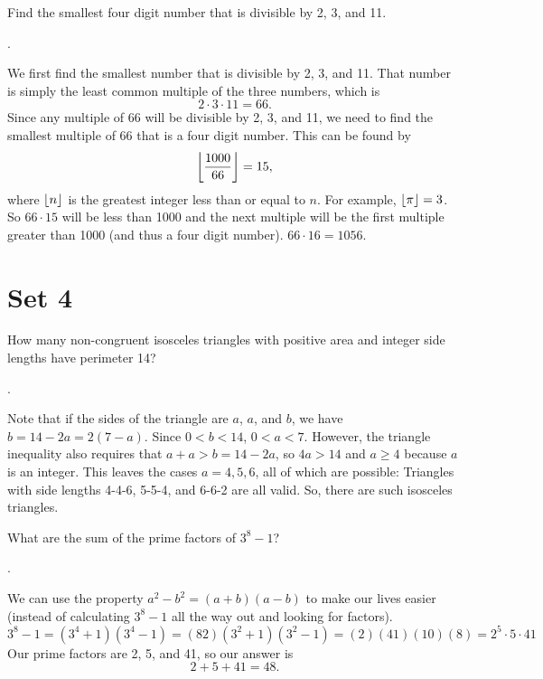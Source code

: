 \documentclass[11pt]{article}
\DeclareRobustCommand{\frac}[3][0pt]{%
  {\begingroup\hspace{#1}#2\hspace{#1}\endgroup\over\hspace{#1}#3\hspace{#1}}}
\begin{document}
\begin{problem}Find the smallest four digit number that is divisible by 2, 3, and 11.
\end{problem}
\begin{answer}
.
\end{answer}
\begin{solution}
We first find the smallest number that is divisible by 2, 3, and 11. That number is simply the least common multiple of the three numbers, which is
$$2\cdot 3\cdot 11=66.$$
Since any multiple of 66 will be divisible by 2, 3, and 11, we need to find the smallest multiple of 66 that is a four digit number. This can be found by
$$\floor{\frac{1000}{66}}=15,$$
where $\left\lfloor n \right\rfloor$ is the greatest integer less than or equal to $n$. For example, $\left\lfloor \pi \right\rfloor=3$. \\
So $66 \cdot 15$ will be less than 1000 and the next multiple will be the first multiple greater than 1000 (and thus a four digit number). $66 \cdot 16 = \boxed{1056}.$
\end{solution}

\eject

\section*{Set 4}

\begin{problem}
How many non-congruent isosceles triangles with positive area and integer side lengths have perimeter 14?
\end{problem}
\begin{answer}
.
\end{answer}
\begin{solution}
Note that if the sides of the triangle are $a$, $a$, and $b$, we have $b = 14 - 2a = 2(7 - a)$. Since $0 < b < 14$, $0 < a < 7$. However, the triangle inequality also requires that $a + a > b = 14 - 2a$, so $4a > 14$ and $a \geq 4$ because $a$ is an integer. This leaves the cases $a = 4, 5, 6$, all of which are possible: Triangles with side lengths 4-4-6, 5-5-4, and 6-6-2 are all valid. So, there are  such isosceles triangles.
\end{solution}

\begin{problem}
What are the sum of the prime factors of $3^{8}-1$?
\end{problem}
\begin{answer}
.
\end{answer}
\begin{solution}
We can use the property $a^2-b^2 = (a+b)(a-b)$ to make our lives easier (instead of calculating $3^8-1$ all the way out and looking for factors).
$$3^8-1 = (3^4+1)(3^4-1) = (82)(3^2+1)(3^2-1)=(2)(41)(10)(8)=2^5 \cdot 5 \cdot 41$$
Our prime factors are 2, 5, and 41, so our answer is
$$2+5+41 = \boxed{48}.$$
\end{solution}
\end{document}
